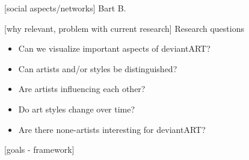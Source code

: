 [social aspects/networks] Bart B.

[why relevant, problem with current research] Research questions\\

\begin{itemize}
\item Can we visualize important aspects of deviantART?
\item Can artists and/or styles be distinguished?
\item Are artists influencing each other?
\item Do art styles change over time?
\item Are there none-artists interesting for deviantART?
\end{itemize}

[goals - framework]